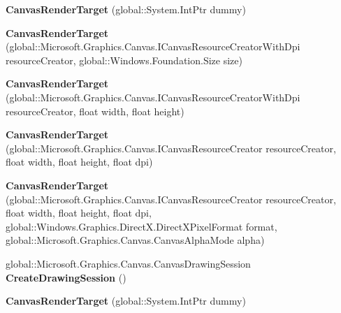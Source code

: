\begin{DoxyCompactItemize}
\item 
\mbox{\label{class_microsoft_1_1_graphics_1_1_canvas_1_1_canvas_render_target_a4669138bf9504f494fe1e580a173f219}} 
{\bfseries Canvas\+Render\+Target} (global\+::\+System.\+Int\+Ptr dummy)
\item 
\mbox{\label{class_microsoft_1_1_graphics_1_1_canvas_1_1_canvas_render_target_a6e7619cdae74a3f3f23f3ad70840e69c}} 
{\bfseries Canvas\+Render\+Target} (global\+::\+Microsoft.\+Graphics.\+Canvas.\+I\+Canvas\+Resource\+Creator\+With\+Dpi resource\+Creator, global\+::\+Windows.\+Foundation.\+Size size)
\item 
\mbox{\label{class_microsoft_1_1_graphics_1_1_canvas_1_1_canvas_render_target_a1ebbe6ada521c806eb64d35b3c9d1c23}} 
{\bfseries Canvas\+Render\+Target} (global\+::\+Microsoft.\+Graphics.\+Canvas.\+I\+Canvas\+Resource\+Creator\+With\+Dpi resource\+Creator, float width, float height)
\item 
\mbox{\label{class_microsoft_1_1_graphics_1_1_canvas_1_1_canvas_render_target_a397381500ed5d38d360913faaac5baac}} 
{\bfseries Canvas\+Render\+Target} (global\+::\+Microsoft.\+Graphics.\+Canvas.\+I\+Canvas\+Resource\+Creator resource\+Creator, float width, float height, float dpi)
\item 
\mbox{\label{class_microsoft_1_1_graphics_1_1_canvas_1_1_canvas_render_target_a69d75f14eb0e74873b4a8ffb803dec0f}} 
{\bfseries Canvas\+Render\+Target} (global\+::\+Microsoft.\+Graphics.\+Canvas.\+I\+Canvas\+Resource\+Creator resource\+Creator, float width, float height, float dpi, global\+::\+Windows.\+Graphics.\+Direct\+X.\+Direct\+X\+Pixel\+Format format, global\+::\+Microsoft.\+Graphics.\+Canvas.\+Canvas\+Alpha\+Mode alpha)
\item 
\mbox{\label{class_microsoft_1_1_graphics_1_1_canvas_1_1_canvas_render_target_a12a2480b49988d0269ab6b58cc3a8433}} 
global\+::\+Microsoft.\+Graphics.\+Canvas.\+Canvas\+Drawing\+Session {\bfseries Create\+Drawing\+Session} ()
\item 
\mbox{\label{class_microsoft_1_1_graphics_1_1_canvas_1_1_canvas_render_target_a4669138bf9504f494fe1e580a173f219}} 
{\bfseries Canvas\+Render\+Target} (global\+::\+System.\+Int\+Ptr dummy)
\end{DoxyCompactItemize}
